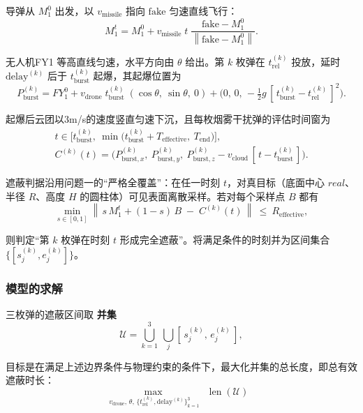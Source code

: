 \documentclass[withoutpreface,bwprint]{cumcmthesis} %
\begin{document}
导弹从 $M_1^0$ 出发，以 $v_{\text{missile}}$ 指向 $\mathrm{fake}$ 匀速直线飞行：
\begin{equation}
	M_1^{t}
	= M_1^0
	+ v_{\text{missile}}\;t\;
	\frac{\mathrm{fake}-M_1^0}{\left\|\mathrm{fake}-M_1^0\right\|}.
\end{equation}

无人机FY1 等高直线匀速，水平方向由 $\theta$ 给出。第 $k$ 枚弹在 $t_{\text{rel}}^{(k)}$ 投放，延时 $\text{delay}^{(k)}$ 后于 $t_{\text{burst}}^{(k)}$ 起爆，其起爆位置为
\begin{equation}
	P_{\text{burst}}^{(k)}
	=
	FY_1^0
	+ v_{\text{drone}}\;t_{\text{burst}}^{(k)}\;(\cos\theta,\ \sin\theta,\ 0)
	+ \big(0,\,0,\,-\tfrac12 g\,[\,t_{\text{burst}}^{(k)}-t_{\text{rel}}^{(k)}\,]^2\big).
\end{equation}

起爆后云团以3m/s的速度竖直匀速下沉，且每枚烟雾干扰弹的评估时间窗为
\begin{gather}
	t\in\Big[t_{\text{burst}}^{(k)},\ \min\big(t_{\text{burst}}^{(k)}+T_{\text{effective}},\ T_{\text{end}}\big)\Big],\\
	C^{(k)}(t)=\Big(P_{\text{burst},x}^{(k)},\ P_{\text{burst},y}^{(k)},\ P_{\text{burst},z}^{(k)}-v_{\text{cloud}}\,[\,t-t_{\text{burst}}^{(k)}\,]\Big).
\end{gather}

遮蔽判据沿用问题一的“严格全覆盖”：在任一时刻 $t$，对真目标（底面中心 $real$、半径 $R$、高度 $H$ 的圆柱体）可见表面离散采样。若对每个采样点 $B$ 都有
\begin{equation}
	\min_{s\in[0,1]}
	\left\|\, s\,M_1^{t} + (1-s)\,B \;-\; C^{(k)}(t) \,\right\|
	\ \le\ R_{\text{effective}},
\end{equation}

则判定“第 $k$ 枚弹在时刻 $t$ 形成完全遮蔽”。将满足条件的时刻并为区间集合 $\{[s_j^{(k)},e_j^{(k)}]\}$。

\subsubsection{模型的求解}

三枚弹的遮蔽区间取 \textbf{并集}
\begin{equation}
	\mathcal{U}=\bigcup_{k=1}^{3}\ \bigcup_j [\,s_j^{(k)},\,e_j^{(k)}\,],
\end{equation}

目标是在满足上述边界条件与物理约束的条件下，最大化并集的总长度，即总有效遮蔽时长：
\begin{equation}
	\max_{\;v_{\text{drone}},\,\theta,\,\{t_{\text{rel}}^{(k)},\text{delay}^{(k)}\}_{k=1}^3}
	\ \ \operatorname{len}(\mathcal{U})
	\quad
	\text{}
\end{equation}
\end{document}

